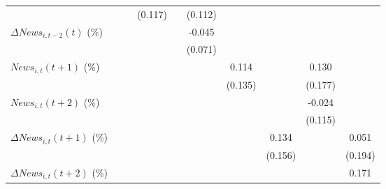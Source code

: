 {\begin{tabular}{l*{9}{c}}
                    &                     &                     &     (0.117)         &                     &     (0.112)         &                     &                     &                     &                     \\
\addlinespace
$ \Delta News_{i,t-2}(t)$ (\%)&                     &                     &                     &                     &      -0.045         &                     &                     &                     &                     \\
                    &                     &                     &                     &                     &     (0.071)         &                     &                     &                     &                     \\
\addlinespace
$ News_{i,t}(t+1)$ (\%)&                     &                     &                     &                     &                     &       0.114         &                     &       0.130         &                     \\
                    &                     &                     &                     &                     &                     &     (0.135)         &                     &     (0.177)         &                     \\
\addlinespace
$ News_{i,t}(t+2)$ (\%)&                     &                     &                     &                     &                     &                     &                     &      -0.024         &                     \\
                    &                     &                     &                     &                     &                     &                     &                     &     (0.115)         &                     \\
\addlinespace
$ \Delta News_{i,t}(t+1)$ (\%)&                     &                     &                     &                     &                     &                     &       0.134         &                     &       0.051         \\
                    &                     &                     &                     &                     &                     &                     &     (0.156)         &                     &     (0.194)         \\
\addlinespace
$ \Delta News_{i,t}(t+2)$ (\%)&                     &                     &                     &                     &                     &                     &                     &                     &       0.171         \\

\end{tabular}}
